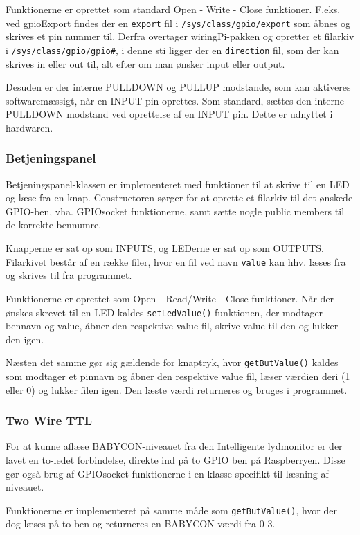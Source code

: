Funktionerne er oprettet som standard Open - Write - Close funktioner. F.eks. ved gpioExport findes der en \verb+export+ fil i \verb+/sys/class/gpio/export+ som åbnes og skrives et pin nummer til. Derfra overtager wiringPi-pakken og opretter et filarkiv i \verb+/sys/class/gpio/gpio#+, i denne sti ligger der en \verb+direction+ fil, som der kan skrives in eller out til, alt efter om man ønsker input eller output.

Desuden er der interne PULLDOWN og PULLUP modstande, som kan aktiveres softwaremæssigt, når en INPUT pin oprettes. Som standard, sættes den interne PULLDOWN modstand ved oprettelse af en INPUT pin. Dette er udnyttet i hardwaren.

\subsubsection*{Betjeningspanel}

Betjeningspanel-klassen er implementeret med funktioner til at skrive til en LED og læse fra en knap. Constructoren sørger for at oprette et filarkiv til det ønskede GPIO-ben, vha. GPIOsocket funktionerne, samt sætte nogle public members til de korrekte bennumre. 

Knapperne er sat op som INPUTS, og LEDerne er sat op som OUTPUTS. Filarkivet består af en række filer, hvor en fil ved navn \verb+value+ kan hhv. læses fra og skrives til fra programmet.

Funktionerne er oprettet som Open - Read/Write - Close funktioner. Når der ønskes skrevet til en LED kaldes \verb+setLedValue()+ funktionen, der modtager bennavn og value, åbner den respektive value fil, skrive value til den og lukker den igen.

Næsten det samme gør sig gældende for knaptryk, hvor \verb+getButValue()+ kaldes som modtager et pinnavn og åbner den respektive value fil, læser værdien deri (1 eller 0) og lukker filen igen. Den læste værdi returneres og bruges i programmet. 

\subsubsection*{Two Wire TTL}

For at kunne aflæse BABYCON-niveauet fra den Intelligente lydmonitor er der lavet en to-ledet forbindelse, direkte ind på to GPIO ben på Raspberryen. Disse gør også brug af GPIOsocket funktionerne i en klasse specifikt til læsning af niveauet.

Funktionerne er implementeret på samme måde som \verb+getButValue()+, hvor der dog læses på to ben og returneres en BABYCON værdi fra 0-3.


